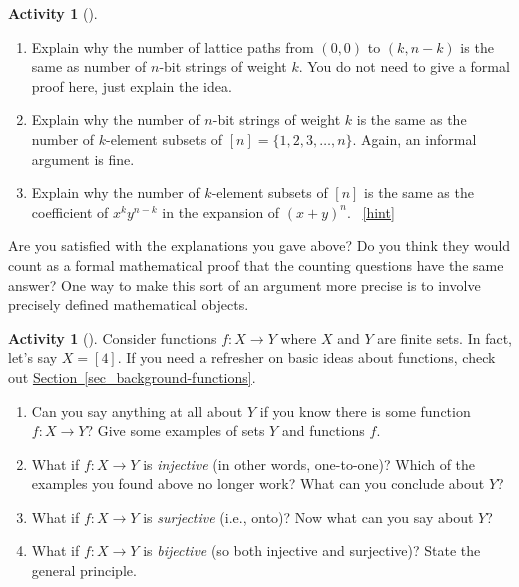 \documentclass[10pt,]{book}
\theoremstyle{plain}
\theoremstyle{definition}
\theoremstyle{definition}
\theoremstyle{definition}
\newtheorem{activity}[project]{Activity}
\numberwithin{equation}{chapter}
\begin{document}
\begin{activity}[]\label{activity-6}
\leavevmode%
\begin{enumerate}[font=\bfseries,label=(\alph*),ref=\alph*]
\item\label{task-19} \hypertarget{p-52}{}%
Explain why the number of lattice paths from \((0,0)\) to \((k,n-k)\) is the same as number of \(n\)-bit strings of weight \(k\). You do not need to give a formal proof here, just explain the idea.%
\item\label{task-20} \hypertarget{p-53}{}%
Explain why the number of \(n\)-bit strings of weight \(k\) is the same as the number of \(k\)-element subsets of \([n] = \{1,2,3,\ldots, n\}\).   Again, an informal argument is fine.%
\item\label{task-21} \hypertarget{p-54}{}%
Explain why the number of \(k\)-element subsets of \([n]\) is the same as the coefficient of \(x^ky^{n-k}\) in the expansion of \((x+y)^n\).%
~\hfill{\tiny\hyperlink{a-6.c}{[hint]}\hypertarget{q-6.c}{}}\end{enumerate}
\end{activity}
\hypertarget{p-56}{}%
Are you satisfied with the explanations you gave above?  Do you think they would count as a formal mathematical proof that the counting questions have the same answer?  One way to make this sort of an argument more precise is to involve precisely defined mathematical objects.%
\begin{activity}[]\label{activity-7}
\hypertarget{p-57}{}%
Consider functions \(f:X \to Y\) where \(X\) and \(Y\) are finite sets.  In fact, let's say \(X = [4]\). If you need a refresher on basic ideas about functions, check out \hyperref[sec_background-functions]{Section~\ref{sec_background-functions}}.%
\begin{enumerate}[font=\bfseries,label=(\alph*),ref=\alph*]
\item\label{task-22} \hypertarget{p-58}{}%
Can you say anything at all about \(Y\) if you know there is some function \(f:X \to Y\)?  Give some examples of sets \(Y\) and functions \(f\).%
\item\label{task-23} \hypertarget{p-59}{}%
What if \(f:X \to Y\) is \emph{injective} (in other words, one-to-one)?  Which of the examples you found above no longer work?  What can you conclude about \(Y\)?%
\item\label{task-24} \hypertarget{p-60}{}%
What if \(f:X \to Y\) is \emph{surjective} (i.e., onto)?  Now what can you say about \(Y\)?%
\item\label{task-25} \hypertarget{p-61}{}%
What if \(f:X\to Y\) is \emph{bijective} (so both injective and surjective)?  State the general principle.%
\end{enumerate}
\end{activity}
\end{document}
